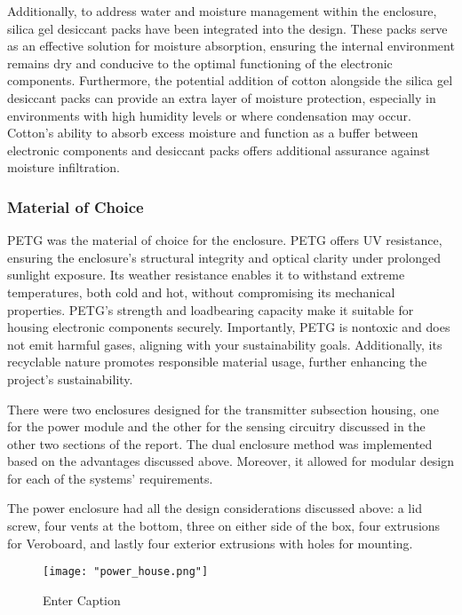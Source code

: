 \documentclass[class=report,11pt,crop=false]{standalone}
\begin{document}
Additionally, to address water and moisture management within the enclosure, silica gel desiccant packs have been integrated into the design. These packs serve as an effective solution for moisture absorption, ensuring the internal environment remains dry and conducive to the optimal functioning of the electronic components. Furthermore, the potential addition of cotton alongside the silica gel desiccant packs can provide an extra layer of moisture protection, especially in environments with high humidity levels or where condensation may occur. Cotton's ability to absorb excess moisture and function as a buffer between electronic components and desiccant packs offers additional assurance against moisture infiltration.
\newline

\subsubsection{Material of Choice}
PETG was the material of choice for the enclosure. PETG offers UV resistance, ensuring the enclosure's structural integrity and optical clarity under prolonged sunlight exposure. Its weather resistance enables it to withstand extreme temperatures, both cold and hot, without compromising its mechanical properties. PETG's strength and loadbearing capacity make it suitable for housing electronic components securely. Importantly, PETG is nontoxic and does not emit harmful gases, aligning with your sustainability goals. Additionally, its recyclable nature promotes responsible material usage, further enhancing the project's sustainability. 
\newline

There were two enclosures designed for the transmitter subsection housing, one for the power module and the other for the sensing circuitry discussed in the other two sections of the report. The dual enclosure method was implemented based on the advantages discussed above. Moreover, it allowed for modular design for each of the systems’ requirements. 
\newline

The power enclosure had all the design considerations discussed above: a lid screw, four vents at the bottom, three on either side of the box, four extrusions for Veroboard, and lastly four exterior extrusions with holes for mounting.
\newline
\begin{figure}[H]
    \centering
    \texttt{[image: "power\_house.png"]}
    \caption{Enter Caption}
    \label{fig:enter-label3}
\end{figure}
\end{document}
